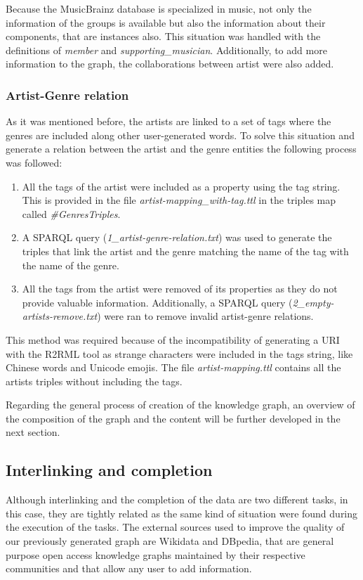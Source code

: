 Because the MusicBrainz database is specialized in music, not only the information of the groups is available but also the information about their components, that are instances also. This situation was handled with the definitions of \textit{member} and \textit{supporting\_musician}. Additionally, to add more information to the graph, the collaborations between artist were also added. 

\subsubsection{Artist-Genre relation}
As it was mentioned before, the artists are linked to a set of tags where the genres are included along other user-generated words.
To solve this situation and generate a relation between the artist and the genre entities the following process was followed:

\begin{enumerate}
\item All the tags of the artist were included as a property using the tag string. This is provided in the file \textit{artist-mapping\_with-tag.ttl} in the triples map called \textit{\#GenresTriples}.

\item A SPARQL query (\textit{1\_artist-genre-relation.txt}) was used to generate the triples that link the artist and the genre matching the name of the tag with the name of the genre.

\item All the tags from the artist were removed of its properties as they do not provide valuable information.
Additionally, a SPARQL query (\textit{2\_empty-artists-remove.txt}) were ran to remove invalid artist-genre relations.
\end{enumerate}

This method was required because of the incompatibility of generating a URI with the R2RML tool as strange characters were included in the tags string, like Chinese words and Unicode emojis. 
The file \textit{artist-mapping.ttl} contains all the artists triples without including the tags.

Regarding the general process of creation of the knowledge graph, an overview of the composition of the graph and the content will be further developed in the next section.

\subsection{Interlinking and completion}
Although interlinking and the completion of the data are two different tasks, in this case, they are tightly related as the same kind of situation were found during the execution of the tasks.
The external sources used to improve the quality of our previously generated graph are Wikidata and DBpedia, that are general purpose open access knowledge graphs maintained by their respective communities and that allow any user to add information. 

